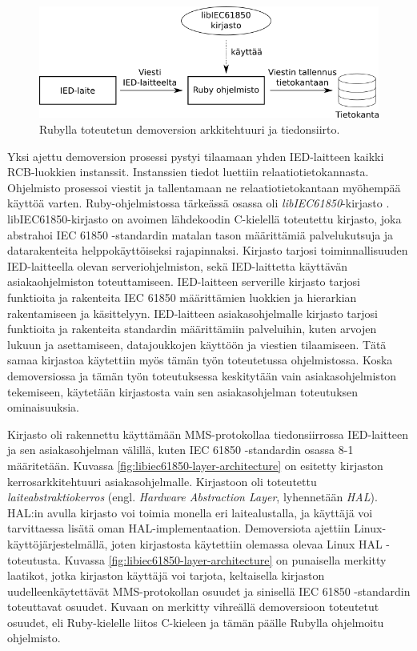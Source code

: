 \begin{figure}[ht!]
	\includegraphics[width=1\textwidth]{pictures/demo-architecture.png}
	\caption{Rubylla toteutetun demoversion arkkitehtuuri ja tiedonsiirto.}
	\label{fig:demo-architecture}
\end{figure}

Yksi ajettu demoversion prosessi pystyi tilaamaan yhden IED-laitteen kaikki RCB-luok\-ki\-en instanssit. Instanssien tiedot luettiin relaatiotietokannasta. Ohjelmisto prosessoi viestit ja tallentamaan ne relaatiotietokantaan myöhempää käyttöä varten. Ruby-ohjelmistossa tärkeässä osassa oli \emph{libIEC61850}-kirjasto \cite{libIEC61850-homepage}. libIEC61850-kirjasto on avoimen lähdekoodin C-kielellä toteutettu kirjasto, joka abstrahoi IEC 61850 -standardin matalan tason määrittämiä palvelukutsuja ja datarakenteita helppokäyttöiseksi rajapinnaksi. Kirjasto tarjosi toiminnallisuuden IED-laitteella olevan serveriohjelmiston, sekä IED-laittetta käyttävän asiakaohjelmiston toteuttamiseen. IED-laitteen serverille kirjasto tarjosi funktioita ja rakenteita IEC 61850 määrittämien luokkien ja hierarkian rakentamiseen ja käsittelyyn. IED-laitteen asiakasohjelmalle kirjasto tarjosi funktioita ja rakenteita standardin määrittämiin palveluihin, kuten arvojen lukuun ja asettamiseen, datajoukkojen käyttöön ja viestien tilaamiseen. Tätä samaa kirjastoa käytettiin myös tämän työn toteutetussa ohjelmistossa. Koska demoversiossa ja tämän työn toteutuksessa keskitytään vain asiakasohjelmiston tekemiseen, käytetään kirjastosta vain sen asiakasohjelman toteutuksen ominaisuuksia.

Kirjasto oli rakennettu käyttämään MMS-protokollaa tiedonsiirrossa IED-laitteen ja sen asiakasohjelman välillä, kuten IEC 61850 -standardin osassa 8-1 määritetään. Kuvassa \ref{fig:libiec61850-layer-architecture} on esitetty kirjaston kerrosarkkitehtuuri asiakasohjelmalle. Kirjastoon oli toteutettu \emph{laiteabstraktiokerros} (engl. \emph{Hardware Abstraction Layer}, lyhennetään \emph{HAL}). HAL:in avulla kirjasto voi toimia monella eri laitealustalla, ja käyttäjä voi tarvittaessa lisätä oman HAL-implementaation. Demoversiota ajettiin Linux-käyttöjärjestelmällä, joten kirjastosta käytettiin olemassa olevaa Linux HAL -toteutusta. Kuvassa \ref{fig:libiec61850-layer-architecture} on punaisella merkitty laatikot, jotka kirjaston käyttäjä voi tarjota, keltaisella kirjaston uudelleenkäytettävät MMS-protokollan osuudet ja sinisellä IEC 61850 -standardin toteuttavat osuudet. Kuvaan on merkitty vihreällä demoversioon toteutetut osuudet, eli Ruby-kielelle liitos C-kieleen ja tämän päälle Rubylla ohjelmoitu ohjelmisto.

